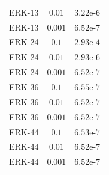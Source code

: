 \documentclass{csri19}
\begin{document}
\begin{table}[hb]
{\begin{tabular}{c|c|c}
      ERK-13          & $0.01$            & $3.22$e-$6$ \\
      ERK-13          & $0.001$           & $6.52$e-$7$ \\
      \hline
      ERK-24          & $0.1$             & $2.93$e-$4$ \\
      ERK-24          & $0.01$            & $2.93$e-$6$ \\
      ERK-24          & $0.001$           & $6.52$e-$7$ \\
      \hline
      ERK-36          & $0.1$             & $6.55$e-$7$ \\
      ERK-36          & $0.01$            & $6.52$e-$7$ \\
      ERK-36          & $0.001$           & $6.52$e-$7$ \\
      \hline
      ERK-44          & $0.1$             & $6.53$e-$7$ \\
      ERK-44          & $0.01$            & $6.52$e-$7$ \\
      ERK-44          & $0.001$           & $6.52$e-$7$
    \end{tabular}}\\


\end{table}
\end{document}
